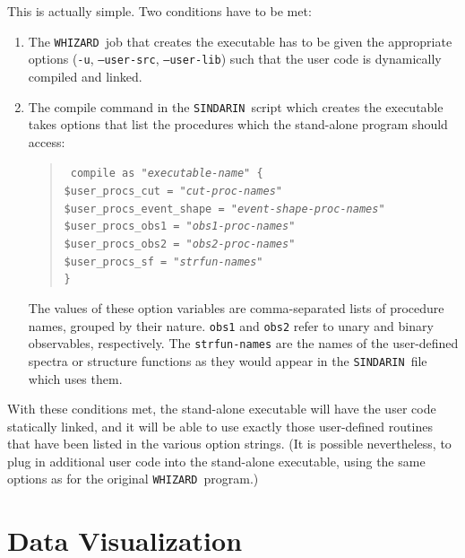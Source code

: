 \documentclass[12pt]{book}
\newcommand{\ttt}[1]{\texttt{#1}}
\newcommand{\whizard}{\texttt{WHIZARD}}
\newcommand{\sindarin}{\texttt{SINDARIN}}
\begin{document}
This is actually simple.  Two conditions have to be met:
\begin{enumerate}
\item
  The \whizard\ job that creates the executable has to be given the appropriate
  options (\ttt{-u}, \ttt{--user-src}, \ttt{--user-lib}) such that
  the user code is dynamically compiled and linked.
\item 
  The compile command in the \sindarin\ script which creates the
  executable takes options that list the procedures which the
  stand-alone program should access:
  \begin{quote}
    \begin{footnotesize}
\ttt{%
compile as "\emph{executable-name}" \{ \\
\hspace*{2em}  \$user\_procs\_cut          = "\emph{cut-proc-names}"\\
\hspace*{2em}  \$user\_procs\_event\_shape = "\emph{event-shape-proc-names}"\\
\hspace*{2em}  \$user\_procs\_obs1         = "\emph{obs1-proc-names}"\\
\hspace*{2em}  \$user\_procs\_obs2         = "\emph{obs2-proc-names}"\\
\hspace*{2em}  \$user\_procs\_sf           = "\emph{strfun-names}"\\
\}}
    \end{footnotesize}
  \end{quote}
  The values of these option variables are comma-separated lists of procedure
  names, grouped by their nature.  \ttt{obs1} and \ttt{obs2} refer to unary
  and binary observables, respectively.  The \ttt{strfun-names} are
  the names of the user-defined spectra or structure functions as they
  would appear in the \sindarin\ file which uses them.
\end{enumerate}
With these conditions met, the stand-alone executable will have the
user code statically linked, and it will be able to use exactly those
user-defined routines that have been listed in the various option
strings.  (It is possible nevertheless, to plug in additional user code
into the stand-alone executable, using the same options as for the
original \whizard\ program.) 

\chapter{Data Visualization}
\label{chap:visualization}
\end{document}
